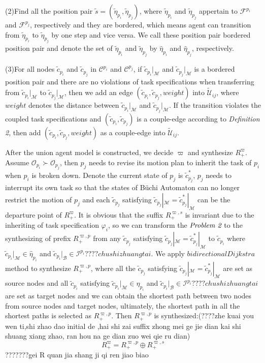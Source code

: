 \documentclass[journal]{IEEEtran}
\begin{document}
(2)Find all the position pair $\tilde{s}=(\tilde{\eta}_{p_i},\tilde{\eta}_{p_j})$, where $\tilde{\eta}_{p_i}$ and $\tilde{\eta}_{p_j}$ appertain to $\mathcal{F}^{p_i}$ and $\mathcal{F}^{p_j}$, respectively and they are bordered, which means agent can transition from $\tilde{\eta}_{p_i}$ to $\tilde{\eta}_{p_j}$ by one step and vice versa. We call these position pair bordered position pair and denote the set of $\tilde{\eta}_{p_i}$ and $\tilde{\eta}_{p_j}$ by $\hat{\eta}_{p_i}$ and $\hat{\eta}_{p_j}$, respectively.\par
(3)For all nodes $\tilde{c}_{p_i}$ and $\tilde{c}_{p_j}$ in $\mathcal{C}^{p_i}$ and $\mathcal{C}^{p_j}$, if $\tilde{c}_{p_i}|_\mathcal{M}$ and $\tilde{c}_{p_j}|_\mathcal{M}$ is a bordered position pair and there are no violations of task specifications when transferring from $\tilde{c}_{p_i}|_\mathcal{M}$ to $\tilde{c}_{p_j}|_\mathcal{M}$, then we add an edge $(\tilde{c}_{p_i},\tilde{c}_{p_j},weight)$ into $\widetilde{\mathcal{U}}_{ij}$, where $weight$ denotes the distance between $\tilde{c}_{p_i}|_\mathcal{M}$ and $\tilde{c}_{p_j}|_\mathcal{M}$. If the transition violates the coupled task specifications and $(\tilde{c}_{p_i},\tilde{c}_{p_j})$ is a couple-edge according to \emph{Definition 2}, then add $(\tilde{c}_{p_i},\tilde{c}_{p_j},weight)$ as a couple-edge into $\widetilde{\mathcal{U}}_{ij}$.\par
After the union agent model is constructed, we decide $\varpi$ and synthesize $R^{\varpi}_+$. Assume $\mathcal{O}_{p_i}\succ \mathcal{O}_{p_j}$, then $p_j$ needs to revise its motion plan to inherit the task of $p_i$ when $p_i$ is broken down. Denote the current state of $p_j$ is $\tilde{c}_{p_j}^{\ast}$, $p_j$ needs to interrupt its own task so that the states of B\"{u}chi Automaton can no longer restrict the motion of $p_j$ and each $\tilde{c}_{p_j}$ satisfying $\tilde{c}_{p_j}|_\mathcal{M}=\tilde{c}_{p_j}^{\ast}|_\mathcal{M}$ can be the departure point of $R^{\varpi}_+$. It is obvious that the suffix $R^{\varpi,s}_+$ is invariant due to the inheriting of task specification $\varphi_i$, so we can transform the $\emph{Problem 2}$ to the synthesizing of prefix $R^{\varpi,p}_+$ from any $\tilde{c}_{p_j}$ satisfying $\tilde{c}_{p_j}|_\mathcal{M}=\tilde{c}_{p_j}^{\ast}|_\mathcal{M}$ to $\tilde{c}_{p_i}$ where $\tilde{c}_{p_i}|_\mathcal{M}\in \hat{\eta}_{p_i}$ and $\tilde{c}_{p_i}|_\mathcal{B}\in \mathcal{I}^{p_i}????chushi zhuangtai$. We apply $bidirectional Dijkstra$ method to synthesize $R^{\varpi,p}_+$, where all the $\tilde{c}_{p_j}$ satisfying $\tilde{c}_{p_j}|_\mathcal{M}=\tilde{c}_{p_j}^{\ast}|_\mathcal{M}$ are set as source nodes and all $\tilde{c}_{p_i}$ satisfying $\tilde{c}_{p_i}|_\mathcal{M}\in \hat{\eta}_{p_i}$ and $\tilde{c}_{p_i}|_\mathcal{B}\in \mathcal{I}^{p_i}????chushi zhuangtai$ are set as target nodes and we can obtain the shortest path between two nodes from source nodes and target nodes, ultimately, the shortest path in all the shortest paths is selected as $R^{\varpi,p}_+$. Then $R^{\varpi,p}_+$ is synthesized:(????zhe kuai you wen ti,shi zhao dao initial de ,hai shi zai suffix zhong mei ge jie dian kai shi shuang xiang zhao, ran hou na ge dian zuo wei qie ru dian)
$$R^{\varpi}_+ = R^{\varpi,p}_+\oplus R^{\varpi,s}_+$$ ???????gei R quan jia shang ji qi ren jiao biao
\end{document}
